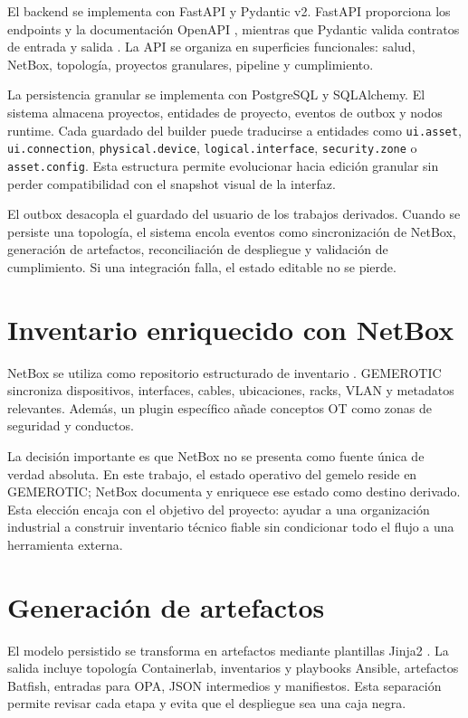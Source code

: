 El backend se implementa con FastAPI y Pydantic v2. FastAPI proporciona los endpoints y la documentación OpenAPI \cite{fastapidocs}, mientras que Pydantic valida contratos de entrada y salida \cite{pydanticdocs}. La API se organiza en superficies funcionales: salud, NetBox, topología, proyectos granulares, pipeline y cumplimiento.

La persistencia granular se implementa con PostgreSQL y SQLAlchemy. El sistema almacena proyectos, entidades de proyecto, eventos de outbox y nodos runtime. Cada guardado del builder puede traducirse a entidades como \texttt{ui.asset}, \texttt{ui.connection}, \texttt{physical.device}, \texttt{logical.interface}, \texttt{security.zone} o \texttt{asset.config}. Esta estructura permite evolucionar hacia edición granular sin perder compatibilidad con el snapshot visual de la interfaz.

El outbox desacopla el guardado del usuario de los trabajos derivados. Cuando se persiste una topología, el sistema encola eventos como sincronización de NetBox, generación de artefactos, reconciliación de despliegue y validación de cumplimiento. Si una integración falla, el estado editable no se pierde.

\section{Inventario enriquecido con NetBox} \label{sec:inventario-netbox}

NetBox se utiliza como repositorio estructurado de inventario \cite{netboxdocs}. GEMEROTIC sincroniza dispositivos, interfaces, cables, ubicaciones, racks, VLAN y metadatos relevantes. Además, un plugin específico añade conceptos OT como zonas de seguridad y conductos.

La decisión importante es que NetBox no se presenta como fuente única de verdad absoluta. En este trabajo, el estado operativo del gemelo reside en GEMEROTIC; NetBox documenta y enriquece ese estado como destino derivado. Esta elección encaja con el objetivo del proyecto: ayudar a una organización industrial a construir inventario técnico fiable sin condicionar todo el flujo a una herramienta externa.

\section{Generación de artefactos} \label{sec:generacion-artefactos}

El modelo persistido se transforma en artefactos mediante plantillas Jinja2 \cite{jinjadocs}. La salida incluye topología Containerlab, inventarios y playbooks Ansible, artefactos Batfish, entradas para OPA, JSON intermedios y manifiestos. Esta separación permite revisar cada etapa y evita que el despliegue sea una caja negra.

